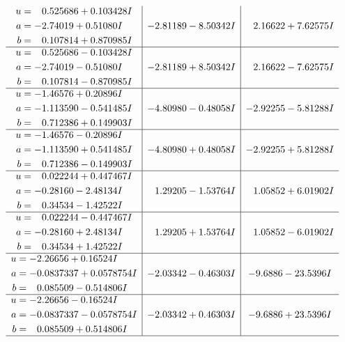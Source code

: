 \documentclass[1p]{elsarticle_modified}
\theoremstyle{definition}
\begin{document}
$$\begin{array}{c|c|c}
\begin{aligned}
u &= \phantom{-}0.525686 + 0.103428 I \\
a &= -2.74019 + 0.51080 I \\
b &= \phantom{-}0.107814 + 0.870985 I\end{aligned}
 & -2.81189 - 8.50342 I & \phantom{-}2.16622 + 7.62575 I \\ \hline\begin{aligned}
u &= \phantom{-}0.525686 - 0.103428 I \\
a &= -2.74019 - 0.51080 I \\
b &= \phantom{-}0.107814 - 0.870985 I\end{aligned}
 & -2.81189 + 8.50342 I & \phantom{-}2.16622 - 7.62575 I \\ \hline\begin{aligned}
u &= -1.46576 + 0.20896 I \\
a &= -1.113590 - 0.541485 I \\
b &= \phantom{-}0.712386 + 0.149903 I\end{aligned}
 & -4.80980 - 0.48058 I & -2.92255 - 5.81288 I \\ \hline\begin{aligned}
u &= -1.46576 - 0.20896 I \\
a &= -1.113590 + 0.541485 I \\
b &= \phantom{-}0.712386 - 0.149903 I\end{aligned}
 & -4.80980 + 0.48058 I & -2.92255 + 5.81288 I \\ \hline\begin{aligned}
u &= \phantom{-}0.022244 + 0.447467 I \\
a &= -0.28160 - 2.48134 I \\
b &= \phantom{-}0.34534 - 1.42522 I\end{aligned}
 & \phantom{-}1.29205 - 1.53764 I & \phantom{-}1.05852 + 6.01902 I \\ \hline\begin{aligned}
u &= \phantom{-}0.022244 - 0.447467 I \\
a &= -0.28160 + 2.48134 I \\
b &= \phantom{-}0.34534 + 1.42522 I\end{aligned}
 & \phantom{-}1.29205 + 1.53764 I & \phantom{-}1.05852 - 6.01902 I \\ \hline\begin{aligned}
u &= -2.26656 + 0.16524 I \\
a &= -0.0837337 + 0.0578754 I \\
b &= \phantom{-}0.085509 - 0.514806 I\end{aligned}
 & -2.03342 - 0.46303 I & -9.6886 - 23.5396 I \\ \hline\begin{aligned}
u &= -2.26656 - 0.16524 I \\
a &= -0.0837337 - 0.0578754 I \\
b &= \phantom{-}0.085509 + 0.514806 I\end{aligned}
 & -2.03342 + 0.46303 I & -9.6886 + 23.5396 I\\
 \hline 
 \end{array}$$\newpage\newpage\renewcommand{\arraystretch}{1}
\end{document}
